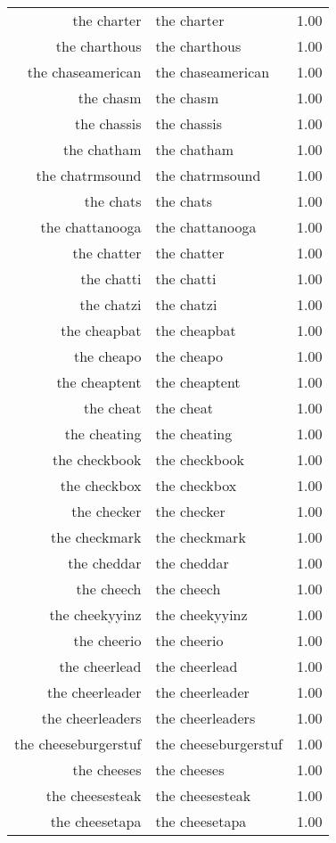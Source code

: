 \begin{table}[ht]
\begin{tabular}{rlr}
  the charter & the charter & 1.00 \\ 
  the charthous & the charthous & 1.00 \\ 
  the chaseamerican & the chaseamerican & 1.00 \\ 
  the chasm & the chasm & 1.00 \\ 
  the chassis & the chassis & 1.00 \\ 
  the chatham & the chatham & 1.00 \\ 
  the chatrmsound & the chatrmsound & 1.00 \\ 
  the chats & the chats & 1.00 \\ 
  the chattanooga & the chattanooga & 1.00 \\ 
  the chatter & the chatter & 1.00 \\ 
  the chatti & the chatti & 1.00 \\ 
  the chatzi & the chatzi & 1.00 \\ 
  the cheapbat & the cheapbat & 1.00 \\ 
  the cheapo & the cheapo & 1.00 \\ 
  the cheaptent & the cheaptent & 1.00 \\ 
  the cheat & the cheat & 1.00 \\ 
  the cheating & the cheating & 1.00 \\ 
  the checkbook & the checkbook & 1.00 \\ 
  the checkbox & the checkbox & 1.00 \\ 
  the checker & the checker & 1.00 \\ 
  the checkmark & the checkmark & 1.00 \\ 
  the cheddar & the cheddar & 1.00 \\ 
  the cheech & the cheech & 1.00 \\ 
  the cheekyyinz & the cheekyyinz & 1.00 \\ 
  the cheerio & the cheerio & 1.00 \\ 
  the cheerlead & the cheerlead & 1.00 \\ 
  the cheerleader & the cheerleader & 1.00 \\ 
  the cheerleaders & the cheerleaders & 1.00 \\ 
  the cheeseburgerstuf & the cheeseburgerstuf & 1.00 \\ 
  the cheeses & the cheeses & 1.00 \\ 
  the cheesesteak & the cheesesteak & 1.00 \\ 
  the cheesetapa & the cheesetapa & 1.00 \\ 

\end{tabular}
\end{table}
